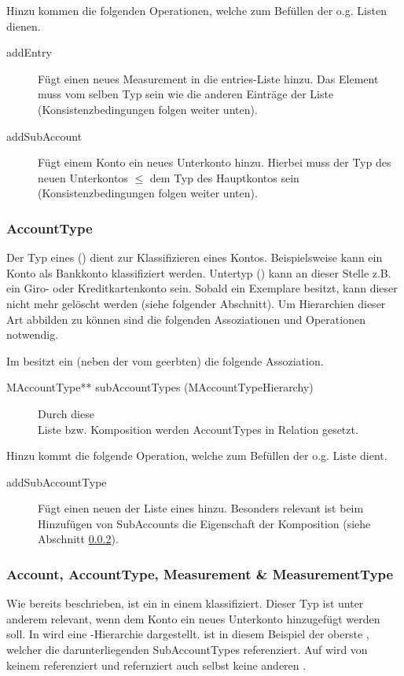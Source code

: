 Hinzu kommen die folgenden Operationen, welche zum Befüllen der o.g. Listen dienen.
\begin{description}
	\item[addEntry] Fügt einen neues Measurement in die entries-Liste hinzu. Das Element muss vom selben Typ sein wie die anderen Einträge der Liste (Konsistenzbedingungen folgen weiter unten).  
	\item[addSubAccount] Fügt einem Konto ein neues Unterkonto hinzu. Hierbei muss der Typ des neuen Unterkontos $\leq$ dem Typ des Hauptkontos sein (Konsistenzbedingungen folgen weiter unten).
\end{description}


\subsubsection{AccountType}
Der Typ eines  () dient zur Klassifizieren eines Kontos. Beispielsweise kann ein Konto als Bankkonto klassifiziert werden. Untertyp () kann an dieser Stelle z.B. ein Giro- oder Kreditkartenkonto sein.
Sobald ein  Exemplare besitzt, kann dieser nicht mehr gelöscht werden (siehe folgender Abschnitt). Um Hierarchien dieser Art abbilden zu können sind die folgenden Assoziationen und Operationen notwendig. 

Im \MM besitzt ein  (neben der vom  geerbten) die folgende Assoziation.
\begin{description}
	\item[MAccountType** subAccountTypes (MAccountTypeHierarchy)] Durch diese \\Liste bzw. Komposition werden AccountTypes in Relation gesetzt.
\end{description}

Hinzu kommt die folgende Operation, welche zum Befüllen der o.g. Liste dient.
\begin{description}
	\item[addSubAccountType] Fügt einen neuen  der  Liste eines  hinzu. Besonders relevant ist beim Hinzufügen 
	von SubAccounts die Eigenschaft der Komposition (siehe Abschnitt \ref{Measurement:accUndAccType}).
\end{description}


\subsubsection{Account, AccountType, Measurement \& MeasurementType}\label{Measurement:accUndAccType}
Wie bereits beschrieben, ist ein  in einem  klassifiziert. Dieser Typ ist unter anderem relevant, wenn dem Konto ein neues Unterkonto hinzugefügt werden soll.  
In  wird eine -Hierarchie dargestellt.  ist in diesem Beispiel der oberste , welcher die darunterliegenden SubAccountTypes referenziert. 
Auf  wird von keinem  referenziert und refernziert auch selbst keine anderen .  

